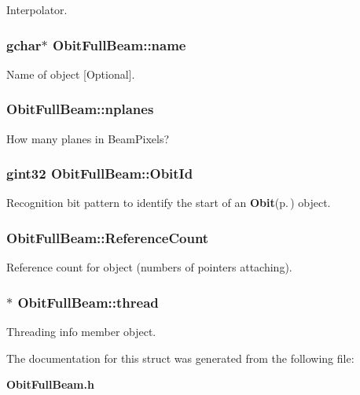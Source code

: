 Interpolator. 

\subsubsection{\setlength{\rightskip}{0pt plus 5cm}gchar$\ast$ {\bf Obit\-Full\-Beam::name}}\label{structObitFullBeam_o3}


Name of object [Optional]. 

\subsubsection{ {\bf Obit\-Full\-Beam::nplanes}}\label{structObitFullBeam_o10}


How many planes in Beam\-Pixels? 

\subsubsection{\setlength{\rightskip}{0pt plus 5cm}gint32 {\bf Obit\-Full\-Beam::Obit\-Id}}\label{structObitFullBeam_o0}


Recognition bit pattern to identify the start of an {\bf Obit}{\rm (p.\,\pageref{structObit})} object. 

\subsubsection{ {\bf Obit\-Full\-Beam::Reference\-Count}}\label{structObitFullBeam_o2}


Reference count for object (numbers of pointers attaching). 

\subsubsection{$\ast$ {\bf Obit\-Full\-Beam::thread}}\label{structObitFullBeam_o4}


Threading info member object. 



The documentation for this struct was generated from the following file:\begin{CompactItemize}
\item 
{\bf Obit\-Full\-Beam.h}\end{CompactItemize}
